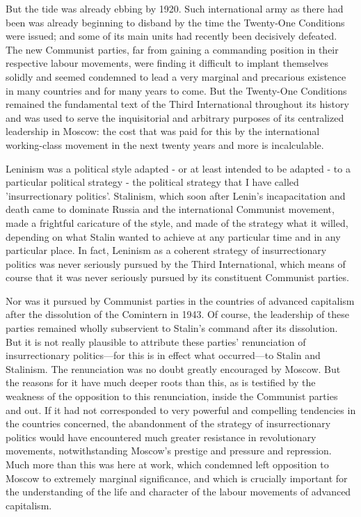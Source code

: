 But the tide was already ebbing by 1920. Such international army as there had been was already beginning to disband by the time the Twenty-One Conditions were issued; and some of its main units had recently been decisively defeated. The new Communist parties, far from gaining a commanding position in their respective labour movements, were finding it difficult to implant themselves solidly and seemed condemned to lead a very marginal and precarious existence in many countries and for many years to come. But the Twenty-One Conditions remained the fundamental text of the Third International throughout its history and was used to serve the inquisitorial and arbitrary purposes of its centralized leadership in Moscow: the cost that was paid for this by the international working-class movement in the next twenty years and more is incalculable.

Leninism was a political style adapted - or at least intended to be adapted - to a particular political strategy - the political strategy that I have called 'insurrectionary politics'. Stalinism, which soon after Lenin's incapacitation and death came to dominate Russia and the international Communist movement, made a frightful caricature of the style, and made of the strategy what it willed, depending on what Stalin wanted to achieve at any particular time and in any particular place. In fact, Leninism as a coherent strategy of insurrectionary politics was never seriously pursued by the Third International, which means of course that it was never seriously pursued by its constituent Communist parties.

Nor was it pursued by Communist parties in the countries of advanced capitalism after the dissolution of the Comintern in 1943. Of course, the leadership of these parties remained wholly subservient to Stalin's command after its dissolution. But it is not really plausible to attribute these parties' renunciation of insurrectionary politics—for this is in effect what occurred—to Stalin and Stalinism. The renunciation was no doubt greatly encouraged by Moscow. But the reasons for it have much deeper roots than this, as is testified by the weakness of the opposition to this renunciation, inside the Communist parties and out. If it had not corresponded to very powerful and compelling tendencies in the countries concerned, the abandonment of the strategy of insurrectionary politics would have encountered much greater resistance in revolutionary movements, notwithstanding Moscow's prestige and pressure and repression. Much more than this was here at work, which condemned left opposition to Moscow to extremely marginal significance, and which is crucially important for the understanding of the life and character of the labour movements of advanced capitalism.

